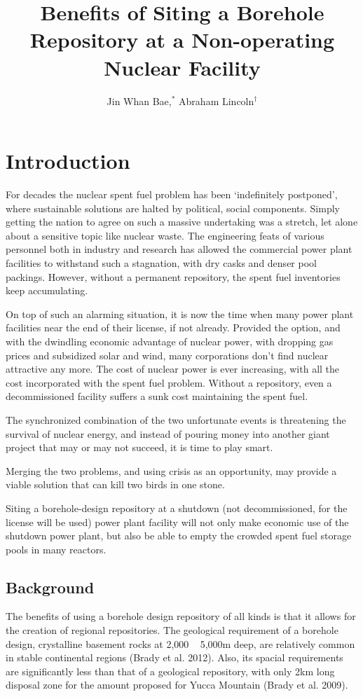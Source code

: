\documentclass{anstrans}
\title{Benefits of Siting a Borehole Repository at a Non-operating Nuclear 
Facility}
\author{Jin Whan Bae,$^{*}$ Abraham Lincoln$^{\dagger}$}
\institute{
$^{*}$Dept. of Nuclear Plasma, and Radiological Engineering, University of Illinois at Urbana-Champaign, Urbana, IL
\and
$^{\dagger}$State Capitol Building, Springfield, IL
}
\begin{document}
\section{Introduction}

For decades the nuclear spent fuel problem has been ‘indefinitely postponed’, 
where sustainable solutions are halted by political, social components. Simply 
getting the nation to agree on such a massive undertaking was a stretch, let 
alone about a sensitive topic like nuclear waste. The engineering feats of 
various personnel both in industry and research has allowed the commercial 
power plant facilities to withstand such a stagnation, with dry casks and 
denser pool packings. However, without a permanent repository, the spent fuel 
inventories keep accumulating.

On top of such an alarming situation, it is now the time when many power plant 
facilities near the end of their license, if not already. Provided the option, 
and with the dwindling economic advantage of nuclear power, with dropping gas 
prices and subsidized solar and wind, many corporations don’t find nuclear 
attractive any more. The cost of nuclear power is ever increasing, with all the 
cost incorporated with the spent fuel problem. Without a repository, even a 
decommissioned facility suffers a sunk cost maintaining the spent fuel.

The synchronized combination of the two unfortunate events is threatening the 
survival of nuclear energy, and instead of pouring money into another giant 
project that may or may not succeed, it is time to play smart.

Merging the two problems, and using crisis as an opportunity, may provide a 
viable solution that can kill two birds in one stone.

Siting a borehole-design repository at a shutdown (not decommissioned, for the 
license will be used) power plant facility will not only make economic use of 
the shutdown power plant, but also be able to empty the crowded spent fuel 
storage pools in many reactors.


\subsection{Background}

The benefits of using a borehole design repository of all kinds is that it 
allows for the creation of regional repositories. The geological requirement of 
a borehole design, crystalline basement rocks at 2,000 ~ 5,000m deep, are 
relatively common in stable continental regions (Brady et al. 2012). Also, its 
spacial requirements are significantly less than that of a geological 
repository, with only 2km long disposal zone for the amount proposed for Yucca 
Mountain (Brady et al. 2009). 
\end{document}
